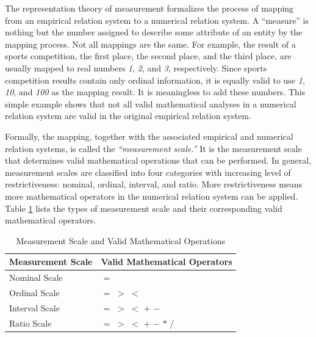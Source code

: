 The representation theory of measurement formalizes the process of mapping from an empirical relation system to a numerical relation system. A ``measure'' is nothing but the number assigned to describe some attribute of an entity by the mapping process. Not all mappings are the same. For example, the result of a sports competition, the first place, the second place, and the third place, are usually mapped to real numbers \textit{1}, \textit{2}, and \textit{3}, respectively. Since sports competition results contain only ordinal information, it is equally valid to use \textit{1}, \textit{10}, and \textit{100} as the mapping result. It is meaningless to add these numbers. This simple example shows that not all valid mathematical analyses in a numerical relation system are valid in the original empirical relation system.

Formally, the mapping, together with the associated empirical and numerical relation systems, is called the \textit{``measurement scale.''} It is the measurement scale that determines valid mathematical operations that can be performed. In general, measurement scales are classified into four categories with increasing level of restrictiveness: nominal, ordinal, interval, and ratio. More restrictiveness means more mathematical operators in the numerical relation system can be applied. Table \ref{table:MeasurementScaleAndOperator} lists the types of measurement scale and their corresponding valid mathematical operators.

\begin{table}[tbp]
	\centering
		\caption{Measurement Scale and Valid Mathematical Operations}
		\begin{tabular}{|p{}|p{}|} 
			\hline
			\textbf{Measurement Scale} & \textbf{Valid Mathematical Operators} \\
			\hline
			{Nominal Scale} & $=$ \\
			\hline
			{Ordinal Scale} & $=$ $>$ $<$ \\
			\hline
			{Interval Scale} & $=$ $>$ $<$ $+$ $-$ \\
			\hline
			{Ratio Scale} & $=$ $>$ $<$ $+$ $-$ $*$ $/$\\
			\hline
		\end{tabular}
	\label{table:MeasurementScaleAndOperator}
\end{table}

